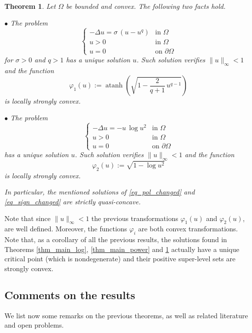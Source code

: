 \documentclass[12pt]{amsart}
\numberwithin{equation}{section}
\newtheorem{theorem}{Theorem}[section]
\theoremstyle{plain}
\theoremstyle{plain}
\theoremstyle{plain}
\theoremstyle{definition}
\newcommand{\beq}{\begin{equation}}
\newcommand{\eeq}{\end{equation}}
\begin{document}
\begin{theorem}
\label{thm_diff_sign}
Let $\Omega$ be bounded and convex. The following two facts hold.

$\bullet$ The problem
\begin{equation}\label{eq_pol_changed}
\begin{cases}
-\Delta u=\sigma\, (u-u^q)& \text{in $\Omega$}\\
u>0&\text{in $\Omega$}\\
u=0&\text{on $\partial\Omega$}
\end{cases}
\end{equation}
for $\sigma>0$ and $q>1$ has a unique solution $u$. Such solution verifies $\|u\|_\infty <1$ and the function 
\beq
\label{varphi1}
\varphi_1(u) :=\operatorname{atanh}\left(\sqrt{1-\frac{2}{q+1} \, u^{q-1}}\right)
\eeq 
is locally strongly convex. 

$\bullet$ 
The problem
\begin{equation}\label{eq_sign_changed}
\begin{cases}
-\Delta u=-u\, \log u^2& \text{in $\Omega$}\\
u>0&\text{in $\Omega$}\\
u=0&\text{on $\partial\Omega$}
\end{cases}
\end{equation}
has a unique solution $u$. Such solution verifies $\|u\|_\infty < 1$ and the function 
\beq
\label{varphi2}
 \varphi_2(u) :=\sqrt{1-\log u^2}
\eeq is locally strongly convex. 

In particular, the mentioned solutions of \eqref{eq_pol_changed} and \eqref{eq_sign_changed} are strictly quasi-concave.
\end{theorem}

Note that since $\|u\|_\infty < 1$ the previous transformations $\varphi_1(u)$ and $\varphi_2(u)$, are well defined. Moreover, the functions $\varphi_i$ are both convex transformations. 
Note that, as a corollary of all the previous results, the solutions found in Theorems \ref{thm_main_log}, \ref{thm_main_power} and \ref{thm_diff_sign} actually have a unique critical point (which is nondegenerate) and their positive super-level sets are strongly convex.


\subsection{Comments on the results}
\label{sec_comments}

We list now some remarks on the previous theorems, as well as related literature and open problems.
\end{document}
